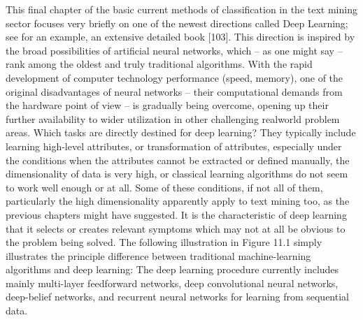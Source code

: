 \documentclass[11pt,openany,executivepaper]{book}
\begin{document}
This final chapter of the basic current methods of classification in the text mining
sector focuses very briefly on one of the newest directions called Deep Learning;
see for an example, an extensive detailed book [103]. This direction is inspired
by the broad possibilities of artificial neural networks, which – as one might say
– rank among the oldest and truly traditional algorithms.
With the rapid development of computer technology performance (speed,
memory), one of the original disadvantages of neural networks – their computational demands from the hardware point of view – is gradually being overcome,
opening up their further availability to wider utilization in other challenging realworld problem areas.
Which tasks are directly destined for deep learning? They typically include
learning high-level attributes, or transformation of attributes, especially under the
conditions when the attributes cannot be extracted or defined manually, the dimensionality of data is very high, or classical learning algorithms do not seem to
work well enough or at all. Some of these conditions, if not all of them, particularly the high dimensionality apparently apply to text mining too, as the previous
chapters might have suggested.
It is the characteristic of deep learning that it selects or creates relevant symptoms which may not at all be obvious to the problem being solved. The following
illustration in Figure 11.1 simply illustrates the principle difference between traditional machine-learning algorithms and deep learning:
The deep learning procedure currently includes mainly multi-layer feedforward networks, deep convolutional neural networks, deep-belief networks,
and recurrent neural networks for learning from sequential data.
\end{document}
